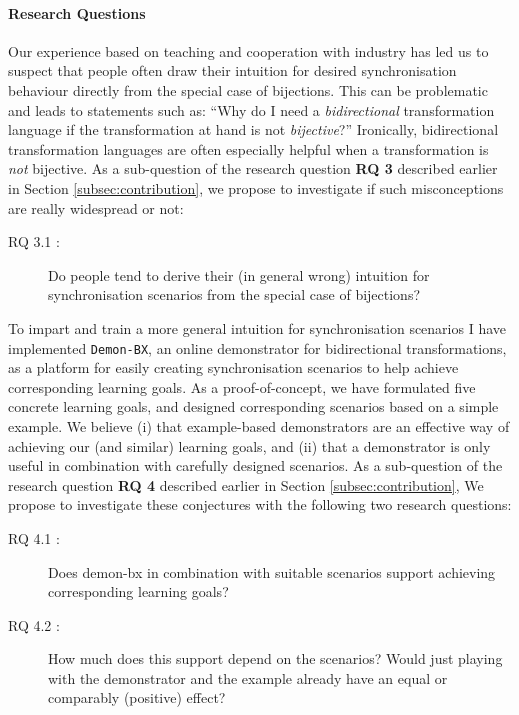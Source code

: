 \paragraph{Research Questions}
Our experience based on teaching and cooperation with industry has led us to suspect that people often draw their intuition for desired synchronisation behaviour directly from the special case of bijections.
This can be problematic and leads to statements such as: ``Why do I need a \emph{bidirectional} transformation language if the transformation at hand is not \emph{bijective}?''
Ironically, bidirectional transformation languages are often especially helpful when a transformation is \emph{not} bijective. As a sub-question of the research question \textbf{RQ 3} described earlier in Section \ref{subsec:contribution}, we propose to investigate if such misconceptions are really widespread or not:

\begin{description}
	\item[RQ 3.1 :] Do people tend to derive their (in general wrong) intuition for synchronisation scenarios from the special case of bijections?
\end{description}

To impart and train a more general intuition for synchronisation scenarios I have implemented \texttt{Demon-BX}, an online demonstrator for bidirectional transformations, as a platform for easily creating synchronisation scenarios to help achieve corresponding learning goals.
As a proof-of-concept, we have formulated five concrete learning goals, and designed corresponding scenarios based on a simple example. We believe (i) that example-based demonstrators are an effective way of achieving our (and similar) learning goals, and (ii) that a demonstrator is only useful in combination with carefully designed scenarios. As a sub-question of the research question \textbf{RQ 4} described earlier in Section \ref{subsec:contribution}, We propose to investigate these conjectures with the following two research questions: 

\begin{description}
	\item[RQ 4.1 :] Does demon-bx in combination with suitable scenarios support achieving corresponding learning goals?
	\item[RQ 4.2 :] How much does this support depend on the scenarios?  Would just playing with the demonstrator and the example already have an equal or comparably (positive) effect?
\end{description}


